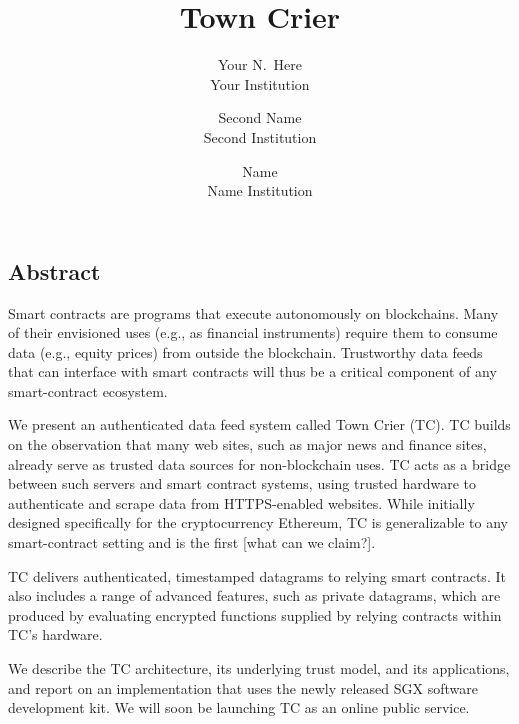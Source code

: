 \documentclass[letterpaper,twocolumn,10pt]{article}
\date{}
\title{\Large \bf Town Crier}
\author{
{\rm Your N.\ Here}\\
Your Institution
\and
{\rm Second Name}\\
Second Institution
\and
{\rm Name}\\
Name Institution
} %
\begin{document}
\maketitle


\subsection*{Abstract}
Smart contracts are programs that execute autonomously on blockchains. Many of their envisioned uses (e.g., as financial instruments) require them to consume data (e.g., equity prices) from outside the blockchain. Trustworthy data feeds that can interface with smart contracts will thus be a critical component of any smart-contract ecosystem.

	We present an authenticated data feed system called Town Crier (TC). TC builds on the observation that many web sites, such as major news and finance sites, already serve as trusted data sources for non-blockchain uses. TC acts as a bridge between such servers and smart contract systems, using trusted hardware to authenticate and scrape data from HTTPS-enabled websites. While initially designed specifically for the cryptocurrency Ethereum, TC is generalizable to any smart-contract setting and is the first [what can we claim?].
	
	TC delivers authenticated, timestamped datagrams to relying smart contracts. It also includes a range of advanced features, such as private datagrams, which are produced by evaluating encrypted functions supplied by relying contracts within TC's hardware.
	
	
	We describe the TC architecture, its underlying trust model, and its applications, and report on an implementation that uses the newly released SGX software development kit. We will soon be launching TC as an online public service.
	









\end{document}
